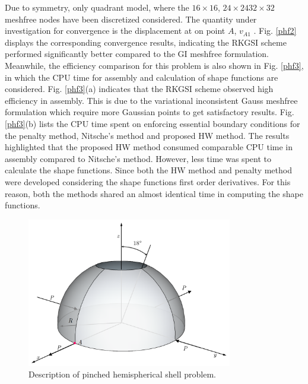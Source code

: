 Due to symmetry, only quadrant model, where the \DIFdelbegin {}\DIFdelend $16\times16$, $24\times24$\DIFdelbegin {}\DIFdelend \DIFaddbegin \DIFadd{, }\DIFaddend $32\times32$ \DIFaddbegin {}\DIFaddend meshfree nodes have been discretized \DIFdelbegin {}\DIFdelend \DIFaddbegin {}\DIFaddend considered. The quantity under investigation for convergence is the displacement at \DIFdelbegin {}\DIFdelend \DIFaddbegin {}\DIFaddend on point $A$, $v_{A1}$ \DIFaddbegin {}\DIFaddend .
Fig. \ref{phf2} displays the corresponding convergence results, indicating the RKGSI scheme performed significantly better compared to the GI meshfree formulation. Meanwhile, the efficiency comparison for this problem is also shown in Fig. \ref{phf3}, in which the CPU time for assembly and calculation of shape functions are considered. Fig. \ref{phf3}(a) indicates that the RKGSI scheme observed high efficiency in assembly. This is due to the variational inconsistent Gauss meshfree formulation which require more Gaussian points to get satisfactory results. Fig. \ref{phf3}(b) lists the CPU time spent on enforcing essential boundary conditions for the penalty method, Nitsche's method and proposed HW method. The results highlighted that the proposed HW method consumed comparable CPU time in assembly compared to Nitsche's method. However, less time was spent to calculate the shape functions. Since both the HW method and penalty method were developed considering the shape functions first order derivatives. For this reason, both the methods shared an almost identical time in computing the shape functions.
\begin{figure}[!ht]
\centering
\includegraphics[width=0.8\textwidth]{figures/pfm}
\caption{Description of pinched hemispherical shell problem.}\label{phf1}
\end{figure}
